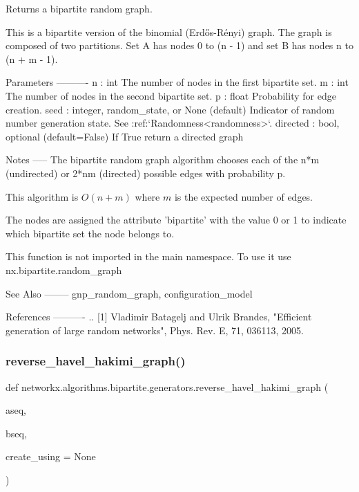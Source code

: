 \begin{DoxyVerb}Returns a bipartite random graph.

This is a bipartite version of the binomial (Erdős-Rényi) graph.
The graph is composed of two partitions. Set A has nodes 0 to
(n - 1) and set B has nodes n to (n + m - 1).

Parameters
----------
n : int
    The number of nodes in the first bipartite set.
m : int
    The number of nodes in the second bipartite set.
p : float
    Probability for edge creation.
seed : integer, random_state, or None (default)
    Indicator of random number generation state.
    See :ref:`Randomness<randomness>`.
directed : bool, optional (default=False)
    If True return a directed graph

Notes
-----
The bipartite random graph algorithm chooses each of the n*m (undirected)
or 2*nm (directed) possible edges with probability p.

This algorithm is $O(n+m)$ where $m$ is the expected number of edges.

The nodes are assigned the attribute 'bipartite' with the value 0 or 1
to indicate which bipartite set the node belongs to.

This function is not imported in the main namespace.
To use it use nx.bipartite.random_graph

See Also
--------
gnp_random_graph, configuration_model

References
----------
.. [1] Vladimir Batagelj and Ulrik Brandes,
   "Efficient generation of large random networks",
   Phys. Rev. E, 71, 036113, 2005.
\end{DoxyVerb}
 \mbox{\label{namespacenetworkx_1_1algorithms_1_1bipartite_1_1generators_ab90b83748f4d4463ff5c4433395feea4}} 
\subsubsection{\texorpdfstring{reverse\+\_\+havel\+\_\+hakimi\+\_\+graph()}{reverse\_havel\_hakimi\_graph()}}
{\footnotesize\ttfamily def networkx.\+algorithms.\+bipartite.\+generators.\+reverse\+\_\+havel\+\_\+hakimi\+\_\+graph (\begin{DoxyParamCaption}\item[{}]{aseq,  }\item[{}]{bseq,  }\item[{}]{create\+\_\+using = {\ttfamily None} }\end{DoxyParamCaption})}


